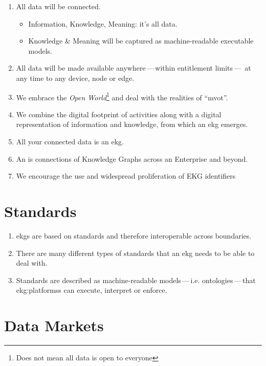 \begin{enumerate}
    \item All data will be connected.
          \begin{itemize}
              \item Information, Knowledge, Meaning: it's all data.
              \item Knowledge \& Meaning will be captured as machine-readable executable models.
          \end{itemize}
    \item All data will be made available anywhere\,---\,within entitlement limits\,---\,%
          at any time to any device, node or edge.
    \item We embrace the \textit{Open World}\footnote{Does not mean all data is open to everyone} and deal with the realities of \enquote{\gls{mvot}}.
    \item We combine the digital footprint of activities along with a digital representation of
          information and knowledge, from which an \gls{ekg} emerges.
    \item All your connected data is an \gls{ekg}.
    \item An  is connections of Knowledge Graphs across an Enterprise and beyond.
    \item We encourage the use and widespread proliferation of EKG identifiers
\end{enumerate}

\section{Standards}

\begin{enumerate}
    \item \Glspl{ekg} are based on standards and therefore interoperable across boundaries.
    \item There are many different types of standards that an \gls{ekg} needs to be able to deal with.
    \item Standards are described as machine-readable models\,---\,i.e. ontologies\,---\,that \glspl{ekg:platforms}
          can execute, interpret or enforce.
\end{enumerate}

\section{Data Markets}

